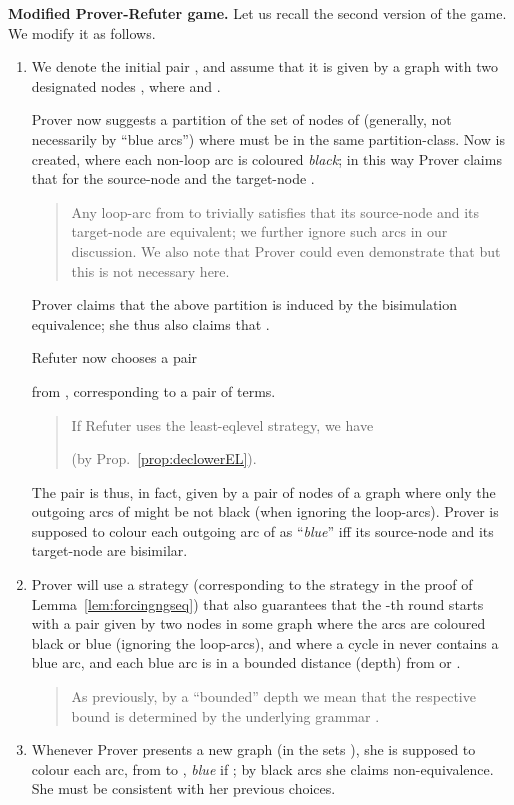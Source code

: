 \documentclass{llncs}
\begin{document}
\textbf{Modified Prover-Refuter game.}
Let us recall the second version of the game. We modify
it as follows.
\begin{enumerate}
	\item
We denote the initial pair , and assume
that it is given 
by a graph  with two designated nodes , 
where 
 and .

Prover now suggests a partition  
of the set of nodes of  (generally, not necessarily by ``blue
arcs'') where
 must be in the same partition-class.
Now  is created, where each non-loop arc
is coloured \emph{black};
in this way Prover claims that  for the
source-node  and the target-node .

\begin{quote}
	{\small
Any loop-arc from  to  trivially satisfies that its
source-node and its target-node are equivalent; 
we further ignore such
arcs in our discussion.
We also note that Prover could even demonstrate that 
but this is not
necessary here.
	}		
\end{quote}	
Prover claims 
that the above partition  
is induced by the bisimulation
equivalence; she thus also claims that .

Refuter now chooses a pair 

from  , corresponding to a pair
 of terms.
\begin{quote}
	{\small
If Refuter uses the least-eqlevel strategy, we have 

(by Prop.~\ref{prop:declowerEL}).
	}		
\end{quote}
The pair  is thus, in fact, given by a pair
 of nodes of a graph  where 
only the outgoing arcs of   might be not
black (when ignoring the loop-arcs). Prover is supposed to colour each
outgoing arc of 
as ``\emph{blue}'' iff its source-node and its target-node
are bisimilar.

\item
Prover will use a strategy (corresponding to the strategy
in the proof of Lemma~\ref{lem:forcingngseq}) that also guarantees  
that the -th round starts with
a pair  given by two nodes 
in some graph  where 
the arcs are coloured black or blue (ignoring the loop-arcs), 
and where a cycle in  never contains a blue arc, and each blue arc is 
in a bounded distance (depth) from  or .
\begin{quote}
	{\small
As previously, by a ``bounded'' depth we mean that the respective
bound is determined by the underlying grammar .
	}		
\end{quote}
\item
Whenever Prover presents a new graph (in the sets ), she is
supposed to colour each arc, from  to , \emph{blue} 
if ; by black arcs she claims non-equivalence.
She must be consistent with her previous choices.


\end{enumerate}
\end{document}
